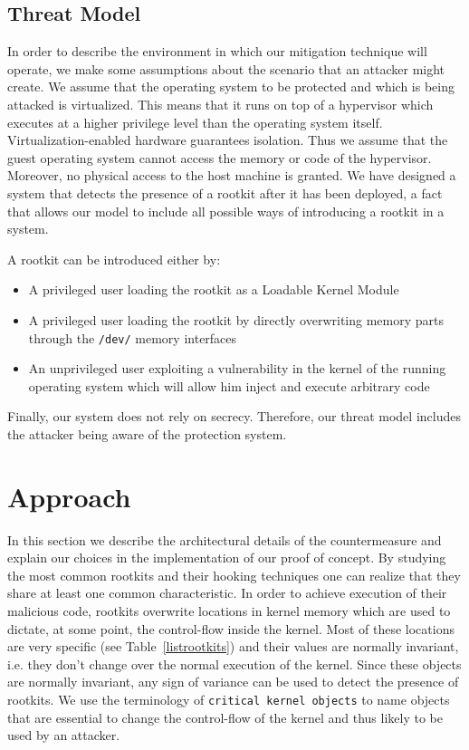 \subsection{Threat Model}
In order to describe the environment in which our mitigation technique will operate, we make some assumptions about the scenario that an attacker might create. We assume that the operating system to be protected and which is being attacked is virtualized. This means that it runs on top of a hypervisor which executes at a higher privilege level than the operating system itself. Virtualization-enabled hardware guarantees isolation. Thus we assume that the guest operating system cannot access the memory or code of the hypervisor. 
Moreover, no physical access to the host machine is granted.
We have designed a system that detects the presence of a rootkit after it has been deployed, a fact that allows our model to include all possible ways of introducing a rootkit in a system. 

A rootkit can be introduced either by: 

\begin{itemize}
\item A privileged user loading the rootkit as a Loadable Kernel Module
\item A privileged user loading the rootkit by directly overwriting memory parts through the \texttt{/dev/} memory interfaces
\item An unprivileged user exploiting a vulnerability in the kernel of the running operating system which will allow him inject and execute arbitrary code
\end{itemize}

Finally, our system does not rely on secrecy. Therefore, our threat model includes the attacker being aware of the protection system.


\section{Approach}\label{hr:approach}
In this section we describe the architectural details of the countermeasure and explain our choices in the implementation of our proof of concept.
By studying the most common rootkits and their hooking techniques one can realize that they share at least one common characteristic. In order to achieve execution of their malicious code, rootkits overwrite locations in kernel memory which are used to dictate, at some point, the control-flow inside the kernel. 
Most of these locations are very specific (see Table~\ref{listrootkits}) and their values are normally invariant, i.e. they don't change over the normal execution of the kernel. Since these objects are normally invariant, any sign of variance can be used to detect the presence of rootkits. We use the terminology of \texttt{critical kernel objects} to name objects that are essential to change the control-flow of the kernel and thus likely to be used by an attacker. 

